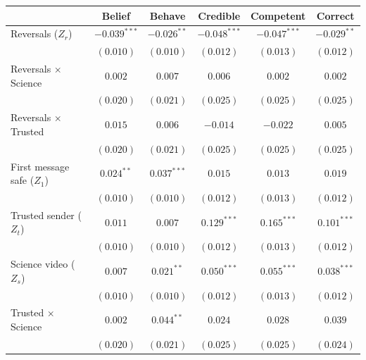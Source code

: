 
\begin{table}
\begin{center}
\begin{tabular}{l c c || c c || c}
\hline
 & Belief & Behave & Credible & Competent & Correct \\
\hline
Reversals ($Z_r$)                      & $-0.039^{***}$ & $-0.026^{**}$ & $-0.048^{***}$ & $-0.047^{***}$ & $-0.029^{**}$ \\
                                       & $(0.010)$      & $(0.010)$     & $(0.012)$      & $(0.013)$      & $(0.012)$     \\
Reversals $\times$ Science             & $0.002$        & $0.007$       & $0.006$        & $0.002$        & $0.002$       \\
                                       & $(0.020)$      & $(0.021)$     & $(0.025)$      & $(0.025)$      & $(0.025)$     \\
Reversals $\times$ Trusted             & $0.015$        & $0.006$       & $-0.014$       & $-0.022$       & $0.005$       \\
                                       & $(0.020)$      & $(0.021)$     & $(0.025)$      & $(0.025)$      & $(0.025)$     \\
First message safe ($Z_1$)             & $0.024^{**}$   & $0.037^{***}$ & $0.015$        & $0.013$        & $0.019$       \\
                                       & $(0.010)$      & $(0.010)$     & $(0.012)$      & $(0.013)$      & $(0.012)$     \\
Trusted sender ($Z_t$)                 & $0.011$        & $0.007$       & $0.129^{***}$  & $0.165^{***}$  & $0.101^{***}$ \\
                                       & $(0.010)$      & $(0.010)$     & $(0.012)$      & $(0.013)$      & $(0.012)$     \\
Science video ($Z_s$)                  & $0.007$        & $0.021^{**}$  & $0.050^{***}$  & $0.055^{***}$  & $0.038^{***}$ \\
                                       & $(0.010)$      & $(0.010)$     & $(0.012)$      & $(0.013)$      & $(0.012)$     \\
Trusted $\times$ Science               & $0.002$        & $0.044^{**}$  & $0.024$        & $0.028$        & $0.039$       \\
                                       & $(0.020)$      & $(0.021)$     & $(0.025)$      & $(0.025)$      & $(0.024)$     \\

\end{tabular}
\end{center}
\end{table}
